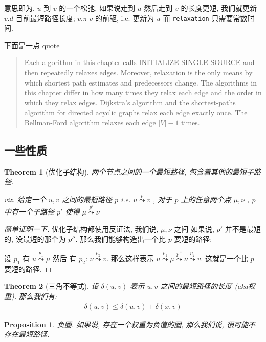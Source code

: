 \documentclass[a4paper, 10pt]{ctexart} %
\newtheorem{theorem}{Theorem}
\newtheorem{proposition}{Proposition}
\begin{document}
意思即为, $u$ 到 $v$ 的一个松弛, 如果说走到 $u$ 然后走到 $v$ 的长度更短, 我们就更新 $v.d$ 目前最短路径长度; $v.\pi$ $v$ 的前驱, i.e. 更新为 $u$
而 \verb|relaxation| 只需要常数时间. 

下面是一点 quote
\begin{quotation}
Each algorithm in this chapter calls INITIALIZE-SINGLE-SOURCE and then repeatedly relaxes edges. Moreover, relaxation is the only means by which shortest
path estimates and predecessors change. The algorithms in this chapter differ in
how many times they relax each edge and the order in which they relax edges. Dijkstra's algorithm and the shortest-paths algorithm for directed acyclic graphs relax
each edge exactly once. The Bellman-Ford algorithm relaxes each edge $\left| V \right|  -1$
times.
\end{quotation}

\subsection{一些性质} %
\label{sub:一些性质}
\begin{theorem}[优化子结构]
    两个节点之间的一个最短路径, 包含着其他的最短子路径. 

    viz. 
    给定一个 $u,v$ 之间的最短路径 $p$ 
    i.e. $u \overset{p}{\leadsto}v$ ,
    对于 $p$ 上的任意两个点 $\mu ,\nu$
    , $p$ 中有一个子路径 $p'$ 使得 
    $ \mu \overset{p'}{\leadsto} \nu$
\end{theorem} 
\begin{proof}[简单证明一下]
优化子结构都使用反证法, 我们说, $ \mu , \nu$ 之间
如果说, $p'$ 并不是最短的, 设最短的那个为 $p''$.
那么我们能够构造出一个比 $p$ 要短的路径:

设 $p_{1}$ 有 $u \overset{p_{1}}{\leadsto} \mu$ 然后 有 $p_{2}$: $\nu  \overset{p_{2}}{\leadsto} v$.
那么这样表示 $u \overset{p_{1}}{\leadsto} \mu \overset{p''}{\leadsto} \nu \overset{p_{2}}{\leadsto} v$.
这就是一个比 $p$ 要短的路径.
\end{proof}
\begin{theorem}[三角不等式]
设 $\delta \left( u ,v\right)$ 表示 $ u ,v$ 之间的最短路径的长度 (aka权重).
那么我们有: 
\begin{align*}
\delta \left( u ,v\right) \le \delta \left( u ,v\right) + \delta \left( x,  v\right)
\end{align*}
\end{theorem}
\begin{proposition}
负圈. 如果说, 存在一个权重为负值的圈, 那么我们说, 
很可能不存在最短路径.
\end{proposition}
\end{document}
